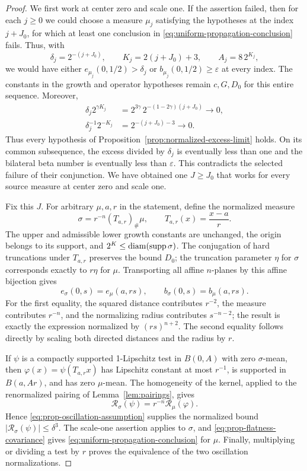 \begin{proof}
We first work at center zero and scale one. If the assertion failed,
then for each $j\ge0$ we could choose a measure $\mu_j$ satisfying
the hypotheses at the index $j+J_0$, for which at least one conclusion
in \eqref{eq:uniform-propagation-conclusion} fails. Thus, with
\[
 \delta_j=2^{-(j+J_0)},\qquad
 K_j=2(j+J_0)+3,\qquad A_j=8\,2^{K_j},
\]
we would have either
$e_{\mu_j}(0,1/2)>\delta_j$ or
$b_{\mu_j}(0,1/2)\ge\varepsilon$ at every index.
The constants in the growth and operator hypotheses remain
$c,G,D_0$ for this entire sequence. Moreover,
\begin{align*}
 \delta_j2^{\gamma K_j}
   &=2^{3\gamma}\,2^{-(1-2\gamma)(j+J_0)}\longrightarrow0,\\
 \delta_j^{-1}2^{-K_j}
   &=2^{-(j+J_0)-3}\longrightarrow0.
\end{align*}
Thus every hypothesis of
Proposition~\ref{prop:normalized-excess-limit} holds.
On its common subsequence, the excess divided by $\delta_j$ is
eventually less than one and the bilateral beta number is eventually
less than $\varepsilon$. This contradicts the selected failure of
their conjunction. We have obtained one $J\ge J_0$ that works for
every source measure at center zero and scale one.

Fix this $J$. For arbitrary $\mu,a,r$ in the statement, define the
normalized measure
\[
 \sigma=r^{-n}(T_{a,r})_\#\mu,
 \qquad T_{a,r}(x)=\frac{x-a}{r}.
\]
The upper and admissible lower growth constants are unchanged, the
origin belongs to its support, and
$2^K\le\operatorname{diam}(\operatorname{supp}\sigma)$. The conjugation of hard truncations
under $T_{a,r}$ preserves the bound $D_0$; the truncation parameter
$\eta$ for $\sigma$ corresponds exactly to $r\eta$ for $\mu$.
Transporting all affine $n$-planes by this affine bijection gives
\begin{equation}\label{eq:prop-flatness-covariance}
 e_\sigma(0,s)=e_\mu(a,rs),\qquad
 b_\sigma(0,s)=b_\mu(a,rs).
\end{equation}
For the first equality, the squared distance contributes $r^{-2}$,
the measure contributes $r^{-n}$, and the normalizing radius contributes
$s^{-n-2}$; the result is exactly the expression normalized by
$(rs)^{n+2}$. The second equality follows directly by scaling both
directed distances and the radius by $r$.

If $\psi$ is a compactly supported 1-Lipschitz test in $B(0,A)$ with
zero $\sigma$-mean, then
$\varphi(x)=\psi(T_{a,r}x)$ has Lipschitz constant at most $r^{-1}$,
is supported in $B(a,Ar)$, and has zero $\mu$-mean.
The homogeneity of the kernel, applied to the renormalized pairing of
Lemma~\ref{lem:pairings}, gives
\[
 \mathcal R_\sigma(\psi)=r^{-n}\mathcal R_\mu(\varphi).
\]
Hence \eqref{eq:prop-oscillation-assumption} supplies the normalized
bound $|\mathcal R_\sigma(\psi)|\le\delta^3$.
The scale-one assertion applies to $\sigma$, and
\eqref{eq:prop-flatness-covariance} gives
\eqref{eq:uniform-propagation-conclusion} for $\mu$.
Finally, multiplying or dividing a test by $r$ proves the equivalence
of the two oscillation normalizations.
\end{proof}


